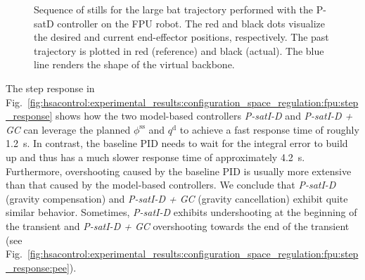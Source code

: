 \begin{figure}[hb]
    \caption{Sequence of stills for the large bat trajectory performed with the P-satD controller on the FPU robot. The red and black dots visualize the desired and current end-effector positions, respectively. The past trajectory is plotted in red (reference) and black (actual). The blue line renders the shape of the virtual backbone.
    }\label{fig:hsacontrol:experimental_results:configuration_space_regulation:fpu:sequence_of_stills:bat}
\end{figure}

The step response in Fig.~\ref{fig:hsacontrol:experimental_results:configuration_space_regulation:fpu:step_response} shows how the two model-based controllers \emph{P-satI-D} and \emph{P-satI-D + GC} can leverage the planned $\phi^\mathrm{ss}$ and $q^\mathrm{d}$ to achieve a fast response time of roughly \SI{1.2}{s}. In contrast, the baseline PID needs to wait for the integral error to build up and thus has a much slower response time of approximately \SI{4.2}{s}. Furthermore, overshooting caused by the baseline PID is usually more extensive than that caused by the model-based controllers.
We conclude that \emph{P-satI-D} (gravity compensation) and \emph{P-satI-D + GC} (gravity cancellation) exhibit quite similar behavior. Sometimes, \emph{P-satI-D} exhibits undershooting at the beginning of the transient and \emph{P-satI-D + GC} overshooting towards the end of the transient (see Fig.~\ref{fig:hsacontrol:experimental_results:configuration_space_regulation:fpu:step_response:pee}).

